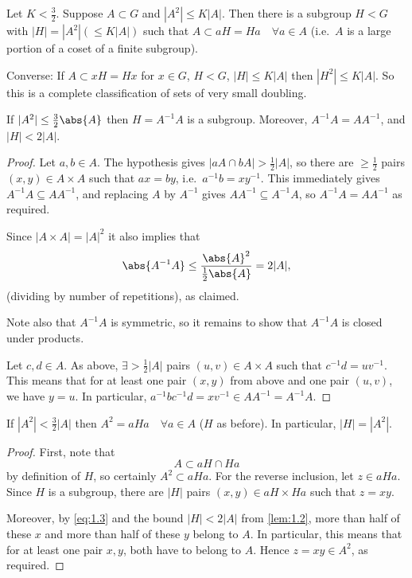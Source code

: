 \documentclass{article}
\numberwithin{equation}{section}
\begin{document}
\begin{nthm}\label{thm:1.1}
  Let $K < \frac{3}{2}$. Suppose $A \subset G$ and $|A^2| \leq K|A|$.
  Then there is a subgroup $H < G$ with $|H| = |A^2| (\leq K|A|)$ such that $A \subset aH = Ha \quad \forall a \in A$
  (i.e.\ $A$ is a large portion of a coset of a finite subgroup).
\end{nthm}
\begin{remark}
  Converse: If $A \subset xH = Hx$ for $x \in G$, $H < G$, $|H| \leq K|A|$ then $|H^2| \leq K|A|$.
  So this is a complete classification of sets of very small doubling.
\end{remark}
\begin{nlemma}[Identify $H$]\label{lem:1.2}
  If $|A^2| \leq \frac{3}{2}\abs{A}$ then $H = A^{-1} A$ is a subgroup.
  Moreover, $A^{-1}A = A A^{-1}$, and $|H| < 2 |A|$.
\end{nlemma}
\begin{proof}
  Let $a,b \in A$.
  The hypothesis gives $|aA \cap bA| > \frac{1}{2}|A|$, so there are $\geq \frac{1}{2}$ pairs $(x,y) \in A \times A$ such that $ax = by$, i.e.\ $a^{-1} b = x y^{-1}$.
  This immediately gives $A^{-1} A \subseteq A A^{-1}$, and replacing $A$ by $A^{-1}$ gives $A A^{-1} \subseteq A^{-1} A$, so $A^{-1}A = A A^{-1}$ as required.

  Since $|A \times A| = |A|^2$ it also implies that
  \begin{equation*}
    \abs{A^{-1}A} \leq \frac{\abs{A}^2}{\frac 12 \abs{A}} = 2 |A|,
  \end{equation*}
  (dividing by number of repetitions), as claimed.

  Note also that $A^{-1}A$ is symmetric, so it remains to show that $A^{-1}A$ is closed under products.

  Let $c,d \in A$. As above, $\exists > \frac{1}{2}|A|$ pairs $(u,v) \in A \times A$ such that $c^{-1} d = u v^{-1}$.
  This means that for at least one pair $(x,y)$ from above and one pair $(u,v)$, we have $y=u$.
  In particular, $a^{-1} b c^{-1} d = x v^{-1} \in A A^{-1} = A^{-1} A$.
\end{proof}
\begin{nlemma}
  If $|A^2| < \frac{3}{2} |A|$ then $A^2 = a H a \quad \forall a \in A$ ($H$ as before). In particular, $|H| = |A^2|$.
\end{nlemma}
\begin{proof}
  First, note that
  \begin{equation}
    A \subset aH \cap Ha \label{eq:1.3}
  \end{equation}
  by definition of $H$, so certainly $A^2 \subset a Ha$. For the reverse inclusion, let $z \in a H a$.
  Since $H$ is a subgroup, there are $|H|$ pairs $(x,y) \in aH \times Ha$ such that $z = xy$.

  Moreover, by \eqref{eq:1.3} and the bound $|H| < 2|A|$ from \cref{lem:1.2}, more than half of these $x$ and more than half of these $y$ belong to $A$.
  In particular, this means that for at least one pair $x,y$, both have to belong to $A$.
  Hence $z = xy \in A^2$, as required.
\end{proof}
\end{document}
